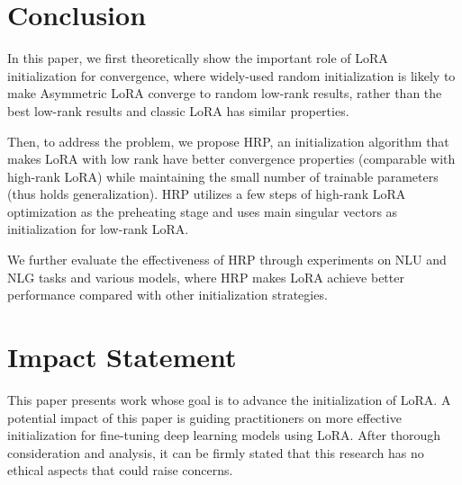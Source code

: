 \section{Conclusion}

In this paper, we first theoretically show the important role of LoRA initialization for convergence, where widely-used random initialization is likely to make Asymmetric LoRA converge to random low-rank results, rather than the best low-rank results and classic LoRA has similar properties. 

Then, to address the problem, we propose HRP, an initialization algorithm that makes LoRA with low rank have better convergence properties (comparable with high-rank LoRA) while maintaining the small number of trainable parameters (thus holds generalization). HRP utilizes a few steps of high-rank LoRA optimization as the preheating stage and uses main singular vectors as initialization for low-rank LoRA. 

We further evaluate the effectiveness of HRP through experiments on NLU and NLG tasks and various models, where HRP makes LoRA achieve better performance compared with other initialization strategies. 



\section*{Impact Statement}

This paper presents work whose goal is to advance the initialization of LoRA. A potential impact of this paper is guiding practitioners on more effective initialization for fine-tuning deep learning models using LoRA. After thorough consideration and analysis, it can be firmly stated that this research has no ethical aspects that could raise concerns. 








